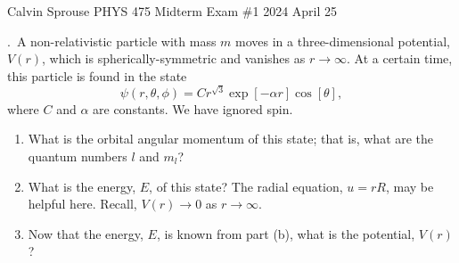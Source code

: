 \documentclass[a4paper, 12pt]{config/homework}
\begin{document}
\noindent
\hfill Calvin Sprouse \hfill PHYS 475 Midterm Exam \#1 \hfill 2024 April 25 \hfill
\bigskip

\bigskip{}.\ A non-relativistic particle with mass \(m\) moves in a three-dimensional potential, \(V(r)\), which is spherically-symmetric and vanishes as \(r\to\infty\). At a certain time, this particle is found in the state
\[\psi(r,\theta,\phi) = Cr^{\sqrt{3}}\exp\left[-\alpha r\right]\cos\left[\theta\right],\]
where \(C\) and \(\alpha\) are constants. We have ignored spin.
\begin{enumerate}[label=(\alph*)]
\item What is the orbital angular momentum of this state; that is, what are the quantum numbers \(l\) and \(m_l\)?
\item What is the energy, \(E\), of this state? The radial equation, \(u=rR\), may be helpful here. Recall, \(V(r)\to0\) as \(r\to\infty\).
\item Now that the energy, \(E\), is known from part (b), what is the potential, \(V(r)\)?
\end{enumerate}
\bigskip
\end{document}
